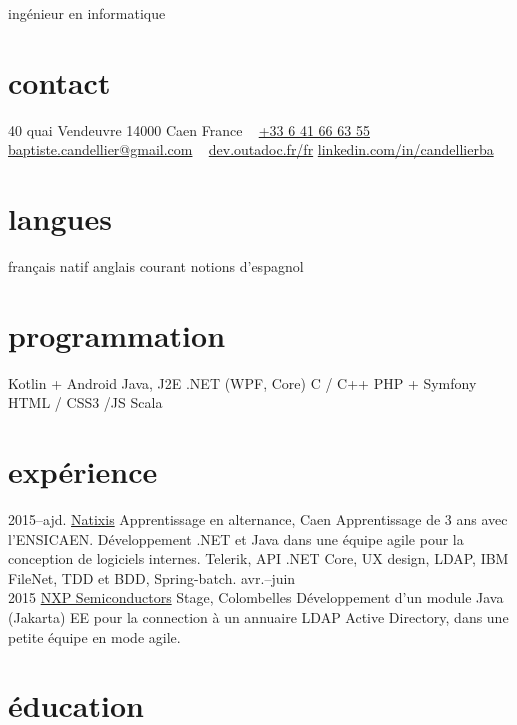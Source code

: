 \documentclass[]{friggeri-cv}
\begin{document}
{ingénieur en informatique}

\begin{aside}
    \section{contact}
    40 quai Vendeuvre
    14000 Caen
    France
    ~
    \href{tel:0033641666355}{+33 6 41 66 63 55}
    \href{mailto:baptiste.candellier@gmail.com}{baptiste.candellier@gmail.com}
    ~
    {\NoAutoSpacing\href{https://dev.outadoc.fr/fr}{dev.outadoc.fr/fr}}
    {\NoAutoSpacing\href{https://www.linkedin.com/in/candellierba/}{linkedin.com/in/candellierba}}
    \section{langues}
    français natif
    anglais courant
    notions d'espagnol
    \section{programmation}
    Kotlin + Android
    Java, J2E
    \csharp .NET (WPF, Core)
    C / C++
    PHP + Symfony
    HTML / CSS3 /JS
    Scala
\end{aside}

\section{expérience}

\begin{entrylist}
	\entry
	{2015--ajd.}
	{\href{https://www.natixis.com}{Natixis}}
	{Apprentissage en alternance, Caen}
	{Apprentissage de 3 ans avec l’ENSICAEN. Développement \csharp .NET et Java dans une équipe agile pour la conception de logiciels internes. Telerik, API .NET Core, UX design, LDAP, IBM FileNet, TDD et BDD, Spring-batch.}
	\entry
	{avr.--juin\\2015}
	{\href{https://www.nxp.com}{NXP Semiconductors}}
	{Stage, Colombelles}
	{Développement d’un module Java (Jakarta) EE pour la connection à un annuaire LDAP Active Directory, dans une petite équipe en mode agile.}
\end{entrylist}

\section{éducation}
\end{document}
